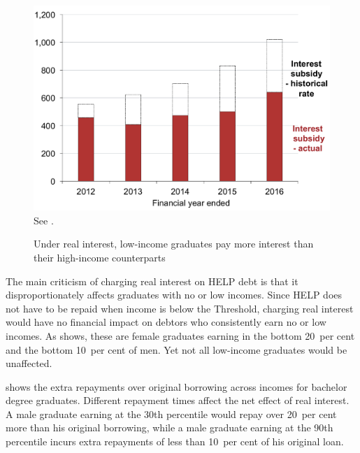 \documentclass[embargoed]{grattan}
\begin{document}
\begin{figure}[!t]
\caption{Under real interest, low-income graduates pay more interest than their high-income counterparts}\label{fig:fig13-under-real-interest-low-income-grads-pay-more-interest-than-high-income-counterparts}


\includegraphics[page=13]{atlas/Chartpack.pdf}
%
{See .}
\end{figure}

The main criticism of charging real interest on \gls{HELP} debt is that it disproportionately affects graduates with no or low incomes.
Since  \gls{HELP} does not have to be repaid when income is below the \gls{Threshold}, charging real interest would have no financial impact on debtors who consistently earn no or low incomes.
As  shows, these are female graduates earning in the bottom 20~per cent and the bottom 10~per cent of men.
Yet not all low-income graduates would be unaffected.

 shows the extra repayments over original borrowing across incomes for bachelor degree graduates.
Different repayment times affect the net effect of real interest.
A male graduate earning at the 30{th} percentile would repay over 20~per cent more than his original borrowing, while a male graduate earning at the 90th percentile incurs extra repayments of less than 10~per cent of his original loan.
\end{document}
